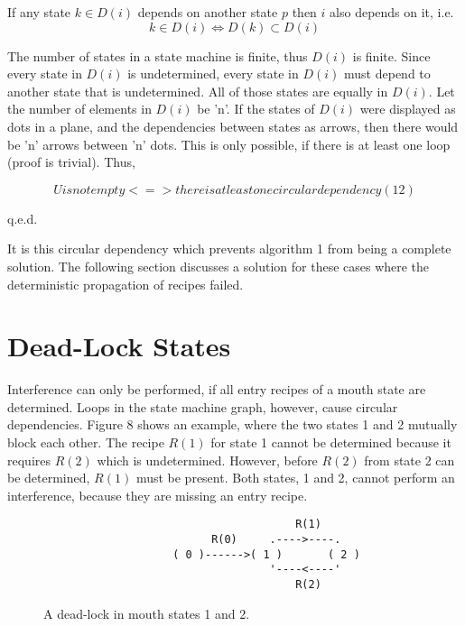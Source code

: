 \documentclass[12pt,a4paper]{scrartcl}
\theoremstyle{break}
\begin{document}
If any state $k \in D(i)$ depends on another state $p$ then $i$ also depends
on it, i.e.
\[
         k \in D(i) \Leftrightarrow D(k) \subset D(i)     
\]

The number of states in a state machine is finite, thus $D(i)$ is finite. Since
every state in $D(i)$ is undetermined, every state in $D(i)$ must depend to
another state that is undetermined. All of those states are equally in $D(i)$.
Let the number of elements in $D(i)$ be 'n'. If the states of $D(i)$ were
displayed as dots in a plane, and the dependencies between states as arrows,
then there would be 'n' arrows between 'n' dots. This is only
possible, if there is at least one loop (proof is trivial). Thus, 

\[
         U is not empty <=> there is at least one circular dependency      (12)
\]

q.e.d.

It is this circular dependency which prevents algorithm 1 from being a complete
solution. The following section discusses a solution for these cases where 
the deterministic propagation of recipes failed.

%
\section{Dead-Lock States}

Interference can only be performed, if all entry recipes of a mouth state are
determined. Loops in the state machine graph, however, cause circular
dependencies.  Figure 8 shows an example, where the two states 1 and 2 mutually
block each other. The recipe $R(1)$ for state 1 cannot be determined because it
requires $R(2)$ which is undetermined. However, before $R(2)$ from state 2 can be
determined, $R(1)$ must be present. Both states, 1 and 2, cannot perform an
interference, because they are missing an entry recipe. 

\begin{figure}[htbp] \leavevmode
\begin{verbatim}
                                       R(1)
                          R(0)     .---->----.
                    ( 0 )------>( 1 )       ( 2 )
                                   '----<----'
                                       R(2)

\end{verbatim}
\caption{A dead-lock in mouth states 1 and 2.}
\end{figure}
\end{document}
